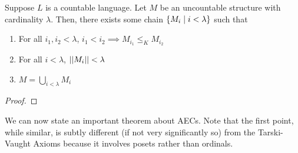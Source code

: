 \begin{boxlemma}
    Suppose $L$ is a countable language. Let $M$ be an uncountable structure with cardinality $\lambda$. Then, there exists some chain $\left\{ M_i \; \middle\vert \; i < \lambda \right\}$ such that
    \begin{enumerate}
        \item For all $i_1, i_2 < \lambda$, $i_1 < i_2 \implies M_{i_1} \leq_K M_{i_2}$
        \item For all $i < \lambda$, $\left\lvert \left\lvert M_i \right\rvert \right\rvert < \lambda$
        \item $M = \bigcup_{i < \lambda} M_i$
    \end{enumerate}
\end{boxlemma}
\begin{proof}
    \sorry
\end{proof}

We can now state an important theorem about AECs. Note that the first point, while similar, is subtly different (if not very significantly so) from the Tarski-Vaught Axioms because it involves posets rather than ordinals.

